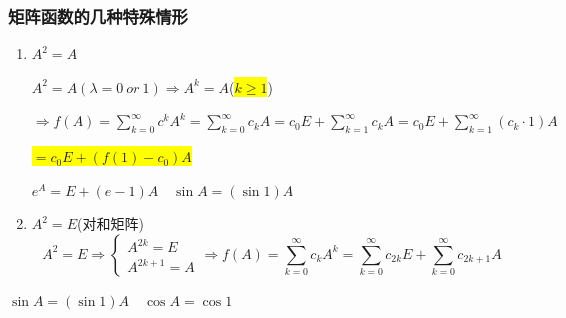 \subsubsection{矩阵函数的几种特殊情形}
\begin{enumerate}
	\item $A^2=A$
	
	$A^2=A(\lambda=0 \ or \ 1)\Rightarrow A^k=A$(\colorbox{yellow}{$k\geq 1$})
	
$\Rightarrow f(A)=\sum\limits_{k=0}^{\infty}c^kA^{k} =\sum\limits_{k=0}^{\infty}c_kA=c_0E+\sum\limits_{k=1}^{\infty}c_kA=c_0E+\sum\limits_{k=1}^{\infty}(c_k\cdot 1)A$

\colorbox{yellow}{$=c_0E+(f(1)-c_0)A$}
\begin{note}
	$e^A=E+(e-1)A\quad \sin A=(\sin1) A$
\end{note}
	
	\item $A^2=E$(对和矩阵)
	\[
	A^2=E\Rightarrow
	\left\{\begin{array}{l}
	A^{2k}=E\\
	A^{2k+1}=A 
	\end{array}\right.
	\Rightarrow f(A)=\sum\limits_{k=0}^{\infty}c_kA^{k}=\sum\limits_{k=0}^{\infty}c_{2k}E+\sum\limits_{k=0}^{\infty}c_{2k+1}A
	\]
	
\end{enumerate}
\begin{note}
	$\sin A=(\sin1) A \quad \cos A=\cos1$
\end{note}



